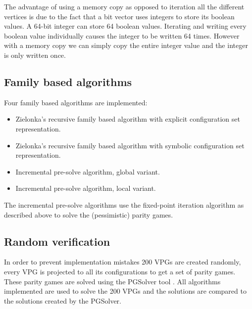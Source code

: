 The advantage of using a memory copy as opposed to iteration all the different vertices is due to the fact that a bit vector uses integers to store its boolean values. A 64-bit integer can store 64 boolean values. Iterating and writing every boolean value individually causes the integer to be written 64 times. However with a memory copy we can simply copy the entire integer value and the integer is only written once.
\subsection{Family based algorithms}
Four family based algorithms are implemented:
\begin{itemize}
	\item Zielonka's recursive family based algorithm with explicit configuration set representation.
	\item Zielonka's recursive family based algorithm with symbolic configuration set representation.
	\item Incremental pre-solve algorithm, global variant.
	\item Incremental pre-solve algorithm, local variant.
\end{itemize}
The incremental pre-solve algorithms use the fixed-point iteration algorithm as described above to solve the (pessimistic) parity games.
\subsection{Random verification}
In order to prevent implementation mistakes 200 VPGs are created randomly, every VPG is projected to all its configurations to get a set of parity games. These parity games are solved using the PGSolver tool \cite{Friedmann2010ThePC}. All algorithms implemented are used to solve the 200 VPGs and the solutions are compared to the solutions created by the PGSolver.